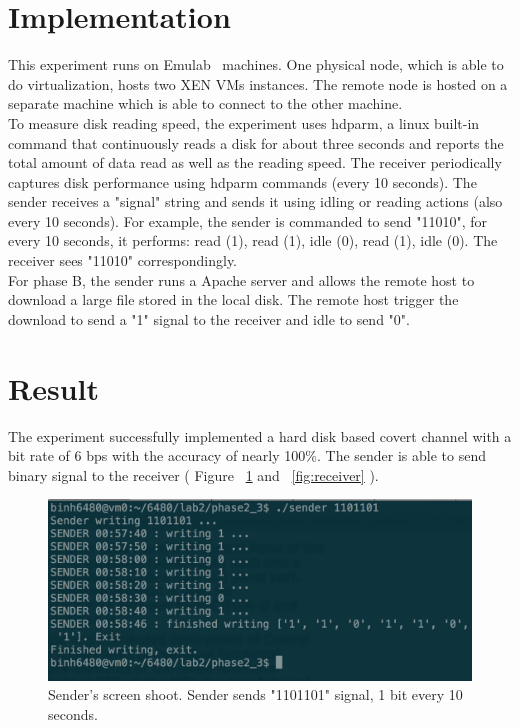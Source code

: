 \section{Implementation}

This experiment runs on Emulab~\cite{white2002integrated} 
machines. One physical node, which is able to do virtualization, 
hosts two XEN VMs instances. The remote node is hosted on a 
separate machine which is able to connect to the other machine.\\

To measure disk reading speed, the experiment uses hdparm, a 
linux built-in command that continuously reads a disk for about 
three seconds and reports the total amount of data read as 
well as the reading speed. The receiver periodically captures 
disk performance using hdparm commands (every 10 seconds). The 
sender receives a "signal" string and sends it using idling or 
reading actions (also every 10 seconds). For example, the sender 
is commanded to send "11010", for every 10 seconds, it performs: 
read (1), read (1), idle (0), read (1), idle (0). The receiver 
sees "11010" correspondingly.\\

For phase B, the sender runs a Apache server and allows the 
remote host to download a large file stored in the local disk. The remote 
host trigger the download to send a "1" signal to the receiver and 
idle to send "0".\\

\section{Result}

The experiment successfully implemented a hard disk based covert channel 
with a bit rate of 6 bps with the accuracy of nearly 100\%. 
The sender is able to send binary signal to the receiver ( Figure ~\ref{fig:sender} and 
~\ref{fig:receiver} ).\\

\begin{figure}[hbtp]
\centering
\includegraphics[scale=0.3]{sender.png}
\caption{Sender's screen shoot. Sender sends "1101101" signal, 1 bit every 10 seconds.}
\label{fig:sender}
\end{figure}

